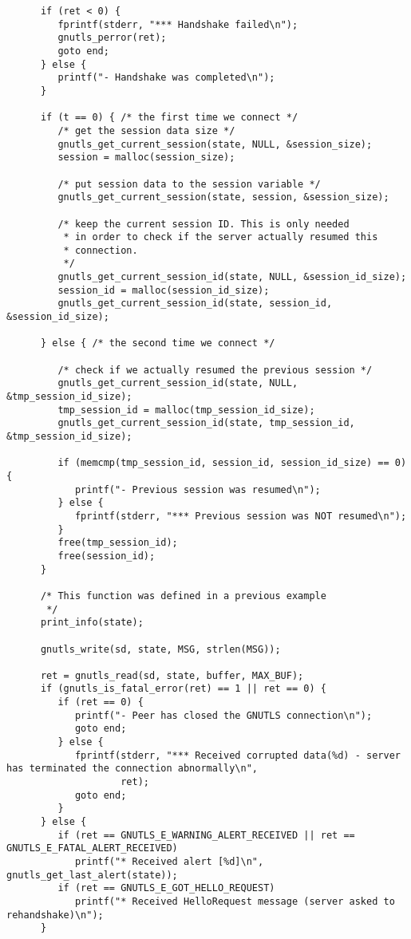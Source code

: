\begin{verbatim}
      if (ret < 0) {
         fprintf(stderr, "*** Handshake failed\n");
         gnutls_perror(ret);
         goto end;
      } else {
         printf("- Handshake was completed\n");
      }

      if (t == 0) { /* the first time we connect */
         /* get the session data size */
         gnutls_get_current_session(state, NULL, &session_size);
         session = malloc(session_size);

         /* put session data to the session variable */
         gnutls_get_current_session(state, session, &session_size);

         /* keep the current session ID. This is only needed
          * in order to check if the server actually resumed this
          * connection.
          */
         gnutls_get_current_session_id(state, NULL, &session_id_size);
         session_id = malloc(session_id_size);
         gnutls_get_current_session_id(state, session_id, &session_id_size);

      } else { /* the second time we connect */

         /* check if we actually resumed the previous session */
         gnutls_get_current_session_id(state, NULL, &tmp_session_id_size);
         tmp_session_id = malloc(tmp_session_id_size);
         gnutls_get_current_session_id(state, tmp_session_id, &tmp_session_id_size);

         if (memcmp(tmp_session_id, session_id, session_id_size) == 0) {
            printf("- Previous session was resumed\n");
         } else {
            fprintf(stderr, "*** Previous session was NOT resumed\n");
         }
         free(tmp_session_id);
         free(session_id);
      }

      /* This function was defined in a previous example
       */
      print_info(state);

      gnutls_write(sd, state, MSG, strlen(MSG));

      ret = gnutls_read(sd, state, buffer, MAX_BUF);
      if (gnutls_is_fatal_error(ret) == 1 || ret == 0) {
         if (ret == 0) {
            printf("- Peer has closed the GNUTLS connection\n");
            goto end;
         } else {
            fprintf(stderr, "*** Received corrupted data(%d) - server has terminated the connection abnormally\n",
                    ret);
            goto end;
         }
      } else {
         if (ret == GNUTLS_E_WARNING_ALERT_RECEIVED || ret == GNUTLS_E_FATAL_ALERT_RECEIVED)
            printf("* Received alert [%d]\n", gnutls_get_last_alert(state));
         if (ret == GNUTLS_E_GOT_HELLO_REQUEST)
            printf("* Received HelloRequest message (server asked to rehandshake)\n");
      }


\end{verbatim}
